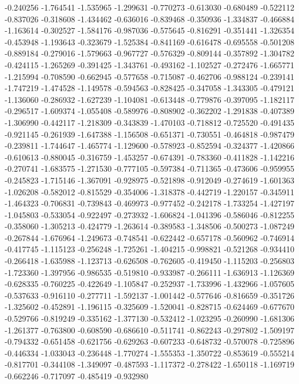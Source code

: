 -0.240256
-1.764541
-1.535965
-1.299631
-0.770273
-0.613030
-0.680489
-0.522112
-0.837026
-0.318608
-1.434462
-0.636016
-0.839468
-0.350936
-1.334837
-0.466884
-1.163614
-0.302527
-1.584176
-0.987036
-0.575645
-0.816291
-0.351441
-1.326354
-0.453948
-1.193643
-0.323679
-1.525384
-0.841169
-0.616478
-0.695558
-0.501208
-0.889184
-0.279016
-1.579663
-0.967727
-0.576329
-0.809144
-0.357892
-1.304782
-0.424115
-1.265269
-0.391425
-1.343761
-0.493162
-1.102527
-0.272476
-1.665771
-1.215994
-0.708590
-0.662945
-0.577658
-0.715087
-0.462706
-0.988124
-0.239141
-1.747219
-1.474528
-1.149578
-0.594563
-0.828425
-0.347058
-1.343305
-0.479121
-1.136060
-0.286932
-1.627239
-1.104081
-0.613448
-0.779876
-0.397095
-1.182117
-0.296517
-1.609374
-1.055408
-0.589976
-0.808902
-0.362202
-1.291838
-0.407389
-1.306990
-0.442117
-1.218309
-0.343839
-1.470103
-0.718812
-0.725520
-0.491435
-0.921145
-0.261939
-1.647388
-1.156508
-0.651371
-0.730551
-0.464818
-0.987479
-0.239811
-1.744647
-1.465774
-1.129600
-0.578923
-0.852594
-0.324377
-1.420866
-0.610613
-0.880045
-0.316759
-1.453257
-0.674391
-0.783360
-0.411828
-1.142216
-0.270741
-1.683575
-1.271530
-0.777105
-0.597384
-0.711365
-0.473606
-0.959955
-0.245823
-1.715146
-1.367091
-0.928975
-0.521898
-0.912049
-0.274619
-1.601363
-1.026208
-0.582012
-0.815529
-0.354006
-1.318378
-0.442719
-1.220157
-0.345911
-1.464323
-0.706831
-0.739843
-0.469973
-0.977452
-0.242178
-1.733254
-1.427197
-1.045803
-0.533054
-0.922497
-0.273932
-1.606824
-1.041396
-0.586046
-0.812255
-0.358060
-1.305213
-0.424779
-1.263614
-0.389583
-1.348506
-0.500273
-1.087249
-0.267844
-1.676964
-1.249673
-0.748541
-0.622442
-0.657178
-0.560962
-0.746914
-0.417745
-1.115123
-0.256248
-1.725261
-1.404215
-0.998821
-0.521268
-0.934410
-0.266418
-1.635988
-1.123713
-0.626508
-0.762605
-0.419450
-1.115203
-0.256803
-1.723360
-1.397956
-0.986535
-0.519810
-0.933987
-0.266111
-1.636913
-1.126369
-0.628335
-0.760225
-0.422649
-1.105847
-0.252937
-1.733996
-1.432966
-1.057605
-0.537633
-0.916110
-0.277711
-1.592137
-1.001442
-0.577646
-0.816659
-0.351726
-1.325602
-0.452891
-1.196115
-0.325609
-1.520041
-0.828715
-0.624469
-0.677670
-0.529766
-0.819249
-0.335162
-1.377130
-0.532412
-1.023295
-0.260990
-1.681306
-1.261377
-0.763800
-0.608590
-0.686610
-0.511741
-0.862243
-0.297802
-1.509197
-0.794332
-0.651458
-0.621756
-0.629263
-0.607233
-0.648732
-0.570078
-0.725896
-0.446334
-1.033043
-0.236448
-1.770274
-1.555353
-1.350722
-0.853619
-0.555214
-0.817701
-0.344108
-1.349097
-0.487593
-1.117372
-0.278422
-1.650118
-1.169719
-0.662246
-0.717097
-0.485419
-0.932980
